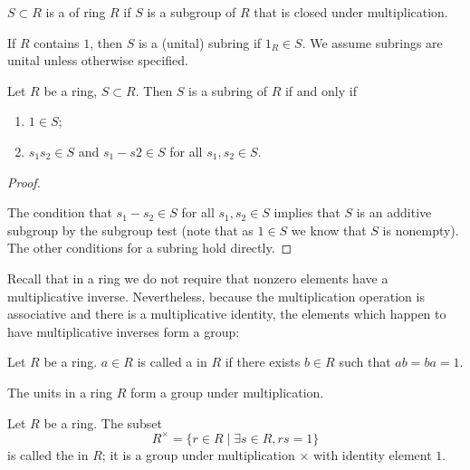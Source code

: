 \begin{definition}[Subring]
$S\subset R$ is a  of ring $R$ if $S$ is a subgroup of $R$ that is closed under multiplication.
\end{definition}

If $R$ contains $1$, then $S$ is a (unital) subring if $1_R\in S$. We assume subrings are unital unless otherwise specified.

\begin{lemma}
Let $R$ be a ring, $S\subset R$. Then $S$ is a subring of $R$ if and only if
\begin{enumerate}[label=(\roman*)]
\item $1\in S$;
\item $s_1s_2\in S$ and $s_1-s2\in S$ for all $s_1,s_2\in S$.
\end{enumerate}
\end{lemma}

\begin{proof} \

\fbox{$\implies$}

\fbox{$\impliedby$} The condition that $s_1-s_2\in S$ for all $s_1,s_2\in S$ implies that $S$ is an additive subgroup by the subgroup test (note that as $1\in S$ we know that $S$ is nonempty). The other conditions for a subring hold directly.
\end{proof}

Recall that in a ring we do not require that nonzero elements have a multiplicative inverse. Nevertheless, because the multiplication operation is associative and there is a multiplicative identity, the elements which happen to have multiplicative inverses form a group:

\begin{definition}[Unit]
Let $R$ be a ring. $a\in R$ is called a  in $R$ if there exists $b\in R$ such that $ab=ba=1$.
\end{definition}

\begin{proposition}
The units in a ring $R$ form a group under multiplication.
\end{proposition}

\begin{definition}
Let $R$ be a ring. The subset
\[R^\times = \{r\in R\mid \exists s\in R, rs=1\}\]
is called the  in $R$; it is a group under multiplication $\times$ with identity element $1$.
\end{definition}

